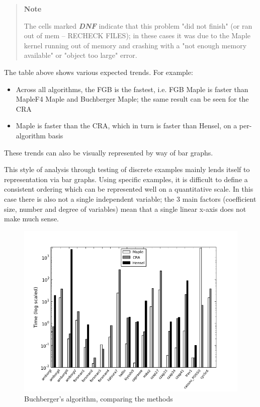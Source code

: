 \documentclass[letterpaper,12pt,titlepage,oneside,final]{book}
\newenvironment{note}{\begin{quote}%
  \textbf{Note }%
  \quad
}{%
\end{quote}%
}
\begin{document}
\newpage 

\begin{note}
  The cells marked \textit{\textbf{DNF}} indicate that this problem "did not finish" (or ran out of mem -- RECHECK FILES); in these cases it was due to the Maple kernel running out of memory and crashing with a "not enough memory available" or "object too large" error.  
\end{note}

The table above shows various expected trends.  For example:

\begin{itemize}
  \item Across all algorithms, the FGB is the fastest, i.e. FGB Maple is faster than MapleF4 Maple and Buchberger Maple; the same result can be seen for the CRA
  \item  Maple is faster than the CRA, which in turn is faster than Hensel, on a per-algorithm basis
\end{itemize}

These trends can also be visually represented by way of bar graphs.

This style of analysis through testing of discrete examples mainly lends itself to representation via bar graphs.  Using specific examples, it is difficult to define a consistent ordering which can be represented well on a quantitative scale.  In this case there is also not a single independent variable; the 3 main factors (coefficient size, number and degree of variables) mean that a single linear x-axis does not make much sense.

\begin{figure}[H]
  \centering
  \includegraphics[scale=0.7]{bb_tests.png}
  \caption{Buchberger's algorithm, comparing the methods \label{fig:bb_tests}}
\end{figure}
\end{document}
